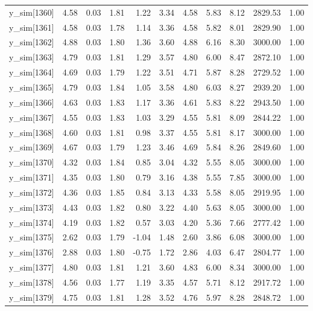 \begin{table}[ht]
\begin{tabular}{rrrrrrrrrrr}
  y\_sim[1360] & 4.58 & 0.03 & 1.81 & 1.22 & 3.34 & 4.58 & 5.83 & 8.12 & 2829.53 & 1.00 \\ 
  y\_sim[1361] & 4.58 & 0.03 & 1.78 & 1.14 & 3.36 & 4.58 & 5.82 & 8.01 & 2829.90 & 1.00 \\ 
  y\_sim[1362] & 4.88 & 0.03 & 1.80 & 1.36 & 3.60 & 4.88 & 6.16 & 8.30 & 3000.00 & 1.00 \\ 
  y\_sim[1363] & 4.79 & 0.03 & 1.81 & 1.29 & 3.57 & 4.80 & 6.00 & 8.47 & 2872.10 & 1.00 \\ 
  y\_sim[1364] & 4.69 & 0.03 & 1.79 & 1.22 & 3.51 & 4.71 & 5.87 & 8.28 & 2729.52 & 1.00 \\ 
  y\_sim[1365] & 4.79 & 0.03 & 1.84 & 1.05 & 3.58 & 4.80 & 6.03 & 8.27 & 2939.20 & 1.00 \\ 
  y\_sim[1366] & 4.63 & 0.03 & 1.83 & 1.17 & 3.36 & 4.61 & 5.83 & 8.22 & 2943.50 & 1.00 \\ 
  y\_sim[1367] & 4.55 & 0.03 & 1.83 & 1.03 & 3.29 & 4.55 & 5.81 & 8.09 & 2844.22 & 1.00 \\ 
  y\_sim[1368] & 4.60 & 0.03 & 1.81 & 0.98 & 3.37 & 4.55 & 5.81 & 8.17 & 3000.00 & 1.00 \\ 
  y\_sim[1369] & 4.67 & 0.03 & 1.79 & 1.23 & 3.46 & 4.69 & 5.84 & 8.26 & 2849.60 & 1.00 \\ 
  y\_sim[1370] & 4.32 & 0.03 & 1.84 & 0.85 & 3.04 & 4.32 & 5.55 & 8.05 & 3000.00 & 1.00 \\ 
  y\_sim[1371] & 4.35 & 0.03 & 1.80 & 0.79 & 3.16 & 4.38 & 5.55 & 7.85 & 3000.00 & 1.00 \\ 
  y\_sim[1372] & 4.36 & 0.03 & 1.85 & 0.84 & 3.13 & 4.33 & 5.58 & 8.05 & 2919.95 & 1.00 \\ 
  y\_sim[1373] & 4.43 & 0.03 & 1.82 & 0.80 & 3.22 & 4.40 & 5.63 & 8.05 & 3000.00 & 1.00 \\ 
  y\_sim[1374] & 4.19 & 0.03 & 1.82 & 0.57 & 3.03 & 4.20 & 5.36 & 7.66 & 2777.42 & 1.00 \\ 
  y\_sim[1375] & 2.62 & 0.03 & 1.79 & -1.04 & 1.48 & 2.60 & 3.86 & 6.08 & 3000.00 & 1.00 \\ 
  y\_sim[1376] & 2.88 & 0.03 & 1.80 & -0.75 & 1.72 & 2.86 & 4.03 & 6.47 & 2804.77 & 1.00 \\ 
  y\_sim[1377] & 4.80 & 0.03 & 1.81 & 1.21 & 3.60 & 4.83 & 6.00 & 8.34 & 3000.00 & 1.00 \\ 
  y\_sim[1378] & 4.56 & 0.03 & 1.77 & 1.19 & 3.35 & 4.57 & 5.71 & 8.12 & 2917.72 & 1.00 \\ 
  y\_sim[1379] & 4.75 & 0.03 & 1.81 & 1.28 & 3.52 & 4.76 & 5.97 & 8.28 & 2848.72 & 1.00 \\ 

\end{tabular}
\end{table}
